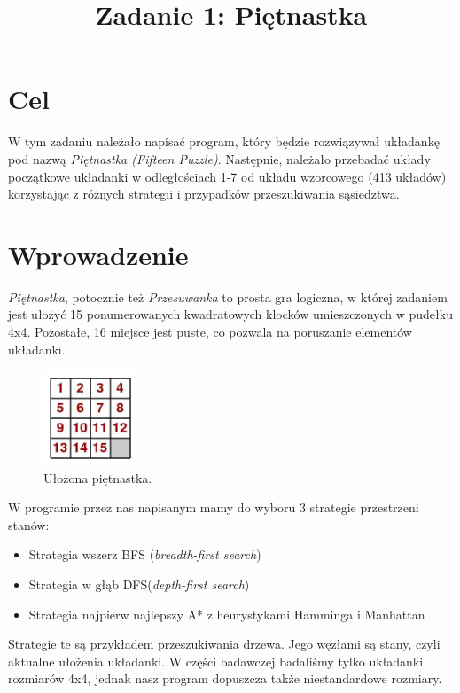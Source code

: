 \documentclass{classrep}
\author{
  \studentinfo{Radosław Grela}{216769} \and
  \studentinfo{Jakub Wąchała}{216914}
}
\title{Zadanie 1: Piętnastka}
\begin{document}
\maketitle

\newpage

\section{Cel}
W tym zadaniu należało napisać program, który będzie rozwiązywał układankę pod nazwą \textsl{Piętnastka (Fifteen Puzzle)}.
Następnie, należało przebadać układy początkowe układanki w odległościach 1-7 od układu wzorcowego (413 układów)
korzystając z różnych strategii i przypadków przeszukiwania sąsiedztwa.

\section{Wprowadzenie}
\textsl{Piętnastka}, potocznie też \textsl{Przesuwanka} to prosta gra logiczna, w której zadaniem jest ułożyć 15 ponumerowanych kwadratowych klocków umieszczonych w pudełku 4x4. Pozostałe, 16 miejsce jest puste, co pozwala na poruszanie elementów układanki.\cite{pierwszymath} 
\begin{figure}[h!]
    \centering
    \includegraphics[width=0.25\textwidth]{15grid1.jpg}
    \caption{Ułożona piętnastka. \cite{pierwszymath}}
\end{figure}

W programie przez nas napisanym mamy do wyboru 3 strategie przestrzeni stanów:
\begin{itemize}
\item Strategia wszerz BFS (\textsl{breadth-first search})
\item Strategia w głąb DFS(\textsl{depth-first search})
\item Strategia najpierw najlepszy A* z heurystykami Hamminga i Manhattan
\end{itemize}
Strategie te są przykładem przeszukiwania drzewa. Jego węzłami są stany, czyli aktualne ułożenia układanki.
W części badawczej badaliśmy tylko układanki rozmiarów 4x4, jednak nasz program dopuszcza także niestandardowe rozmiary.
\end{document}
